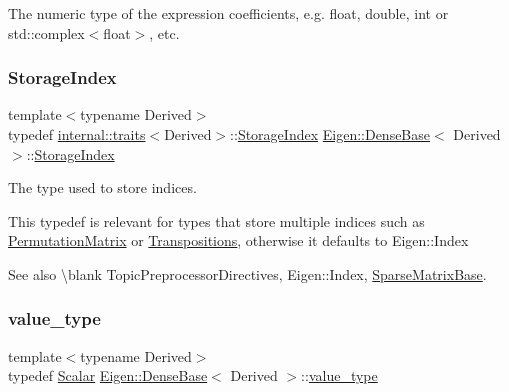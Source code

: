The numeric type of the expression\textquotesingle{} coefficients, e.\+g. float, double, int or std\+::complex$<$float$>$, etc. \mbox{\label{class_eigen_1_1_dense_base_a2d1aba3f6c414715d830f760913c7e00}} 
\subsubsection{\texorpdfstring{StorageIndex}{StorageIndex}}
{\footnotesize\ttfamily template$<$typename Derived$>$ \\
typedef \mbox{\hyperlink{struct_eigen_1_1internal_1_1traits}{internal\+::traits}}$<$Derived$>$\+::\mbox{\hyperlink{class_eigen_1_1_dense_base_a2d1aba3f6c414715d830f760913c7e00}{Storage\+Index}} \mbox{\hyperlink{class_eigen_1_1_dense_base}{Eigen\+::\+Dense\+Base}}$<$ Derived $>$\+::\mbox{\hyperlink{class_eigen_1_1_dense_base_a2d1aba3f6c414715d830f760913c7e00}{Storage\+Index}}}



The type used to store indices. 

This typedef is relevant for types that store multiple indices such as \mbox{\hyperlink{class_eigen_1_1_permutation_matrix}{Permutation\+Matrix}} or \mbox{\hyperlink{class_eigen_1_1_transpositions}{Transpositions}}, otherwise it defaults to Eigen\+::\+Index \begin{DoxySeeAlso}{See also}
\textbackslash{}blank Topic\+Preprocessor\+Directives, Eigen\+::\+Index, \mbox{\hyperlink{class_eigen_1_1_sparse_matrix_base}{Sparse\+Matrix\+Base}}. 
\end{DoxySeeAlso}
\mbox{\label{class_eigen_1_1_dense_base_a9276182dab8236c33f1e7abf491d504d}} 
\subsubsection{\texorpdfstring{value\_type}{value\_type}}
{\footnotesize\ttfamily template$<$typename Derived$>$ \\
typedef \mbox{\hyperlink{class_eigen_1_1_dense_base_a5feed465b3a8e60c47e73ecce83e39a2}{Scalar}} \mbox{\hyperlink{class_eigen_1_1_dense_base}{Eigen\+::\+Dense\+Base}}$<$ Derived $>$\+::\mbox{\hyperlink{class_eigen_1_1_dense_base_a9276182dab8236c33f1e7abf491d504d}{value\+\_\+type}}}

